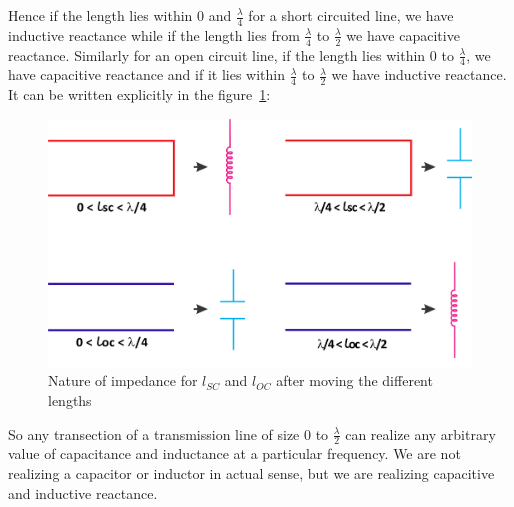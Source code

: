 Hence if the length lies within 0 and $ \frac{\lambda}{4} $ for a short circuited line, we have inductive reactance while if the length lies from $ \frac{\lambda}{4} $ to $ \frac{\lambda}{2} $ we have capacitive reactance. Similarly for an open circuit line, if  the length lies within 0 to $ \frac{\lambda}{4} $, we have capacitive reactance and if it lies within $ \frac{\lambda}{4} $ to $ \frac{\lambda}{2} $ we have inductive reactance. It can be written explicitly in the figure~\ref{fig:group10diagram10}:
\begin{figure}[h]
\centering
\includegraphics[width=1\linewidth]{./graphics/group10diagram9}
\caption{Nature of impedance for $ l_{SC} $ and $ l_{OC} $ after moving the different lengths}
\label{fig:group10diagram10}
\end{figure}

So any transection of a transmission line of size 0 to $ \frac{\lambda}{2} $ can realize any arbitrary value of capacitance and inductance at a particular frequency. We are not realizing a capacitor or inductor in actual sense, but we are realizing capacitive and inductive reactance.

